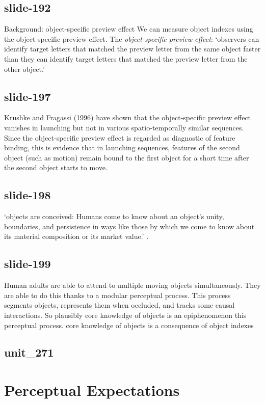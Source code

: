\documentclass[12pt,\papersize]{extarticle}
\begin{document}
 
\subsection{slide-192}
Background: object-specific preview effect
We can measure object indexes using the object-specific preview effect.
The \emph{object-specific preview effect}: ‘observers can identify target letters that matched the preview letter from the same object faster than they can identify target letters that matched the preview letter from the other object.’
\citep[p.\ 2]{Krushke:1996ge}
 
 
\subsection{slide-197}
Krushke and Fragassi (1996) have shown that the object-specific preview effect vanishes in launching but not in various spatio-temporally similar sequences. Since the object-specific preview effect is regarded as diagnostic of feature binding, this is evidence that in launching sequences, features of the second object (such as motion) remain bound to the first object for a short time after the second object starts to move.
 
 
\subsection{slide-198}
‘objects are conceived: Humans come to know about an object’s unity, boundaries, and persistence in ways like those by which we come to know about its material composition or its market value.’
\citep[p.\ 198]{Spelke:1988xc}.
 
 
\subsection{slide-199}
Human adults are able to attend to multiple moving objects simultaneously.
They are able to do this thanks to a modular perceptual process.
This process segments objects, represents them when occluded, and tracks some causal interactions.
So plausibly core knowledge of objects is an epiphenomenon this perceptual process.
core knowledge of objects is a consequence of object indexes
\citep{Leslie:1998zk,Carey:2001ue}
 
 
\subsection{unit\_271}
 
\section{Perceptual Expectations}
 
\end{document}
